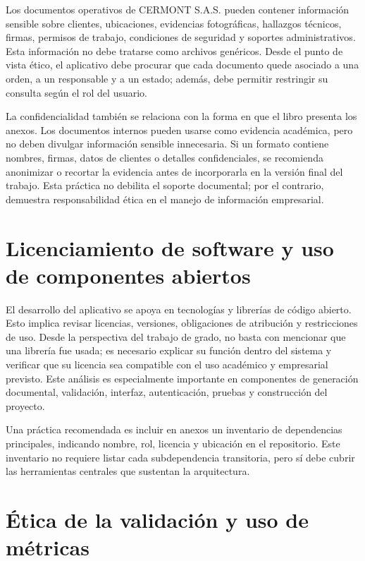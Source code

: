 Los documentos operativos de CERMONT S.A.S. pueden contener información sensible sobre clientes, ubicaciones, evidencias fotográficas, hallazgos técnicos, firmas, permisos de trabajo, condiciones de seguridad y soportes administrativos. Esta información no debe tratarse como archivos genéricos. Desde el punto de vista ético, el aplicativo debe procurar que cada documento quede asociado a una orden, a un responsable y a un estado; además, debe permitir restringir su consulta según el rol del usuario.

La confidencialidad también se relaciona con la forma en que el libro presenta los anexos. Los documentos internos pueden usarse como evidencia académica, pero no deben divulgar información sensible innecesaria. Si un formato contiene nombres, firmas, datos de clientes o detalles confidenciales, se recomienda anonimizar o recortar la evidencia antes de incorporarla en la versión final del trabajo. Esta práctica no debilita el soporte documental; por el contrario, demuestra responsabilidad ética en el manejo de información empresarial.

\section{Licenciamiento de software y uso de componentes abiertos}
\label{sec:licenciamiento-componentes-abiertos}

El desarrollo del aplicativo se apoya en tecnologías y librerías de código abierto. Esto implica revisar licencias, versiones, obligaciones de atribución y restricciones de uso. Desde la perspectiva del trabajo de grado, no basta con mencionar que una librería fue usada; es necesario explicar su función dentro del sistema y verificar que su licencia sea compatible con el uso académico y empresarial previsto. Este análisis es especialmente importante en componentes de generación documental, validación, interfaz, autenticación, pruebas y construcción del proyecto.

Una práctica recomendada es incluir en anexos un inventario de dependencias principales, indicando nombre, rol, licencia y ubicación en el repositorio. Este inventario no requiere listar cada subdependencia transitoria, pero sí debe cubrir las herramientas centrales que sustentan la arquitectura.

\section{Ética de la validación y uso de métricas}
\label{sec:etica-validacion-metricas}


